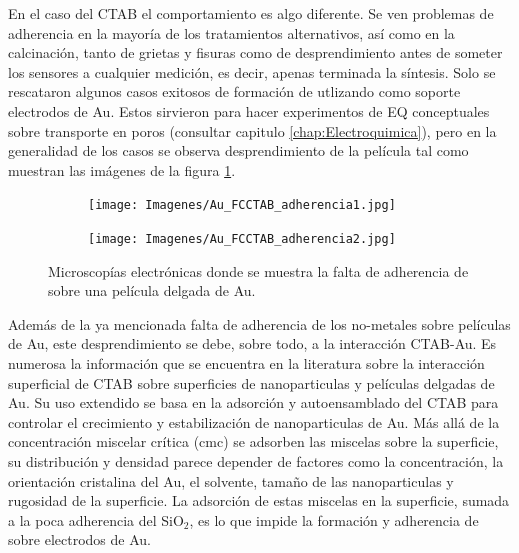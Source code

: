 			En el caso del CTAB el comportamiento es algo diferente. Se ven problemas de adherencia en la mayoría de los tratamientos alternativos, así como en la calcinación, tanto de grietas y fisuras como de desprendimiento antes de someter los sensores a cualquier medición, es decir, apenas terminada la síntesis. Solo se rescataron algunos casos exitosos de formación de \pdmC\space utlizando como soporte electrodos de Au. Estos sirvieron para hacer experimentos de EQ conceptuales sobre transporte en poros (consultar capitulo \ref{chap:Electroquimica}), pero en la generalidad de los casos se observa desprendimiento de la película tal como muestran las imágenes de la figura \ref{fig:CTAB_adherencia}.
	     
				\begin{figure}[th]
		 	   	    \begin{subfigure}[t]{0.49\textwidth}
			        	\texttt{[image: Imagenes/Au\_FCCTAB\_adherencia1.jpg]}
			       		\end{subfigure}
					\begin{subfigure}[t]{0.49\textwidth}
			 	   	    \texttt{[image: Imagenes/Au\_FCCTAB\_adherencia2.jpg]}
			       		\end{subfigure}
					 \caption[Adherencia de CTAB sobre electrodos.]{Microscopías electrónicas donde se muestra la falta de adherencia de \pdmC \space sobre una película delgada de Au.}
					 \label{fig:CTAB_adherencia}	
				     \end{figure}
			Además de la ya mencionada falta de adherencia de los no-metales sobre películas de Au, este desprendimiento se debe, sobre todo, a la interacción CTAB-Au. Es numerosa la información que se encuentra en la literatura sobre la interacción superficial de CTAB sobre superficies de nanoparticulas y películas delgadas de Au\cite{Cheng2003,Smith2008,Lim2014,Meena2013,Wang2013,Hamon2009}. Su uso extendido se basa en la adsorción y autoensamblado del CTAB para controlar el crecimiento y estabilización de nanoparticulas de Au. Más allá de la concentración miscelar crítica (cmc) se adsorben las miscelas sobre la superficie, su distribución y densidad parece depender de factores como la concentración, la orientación cristalina del Au, el solvente, tamaño de las nanoparticulas y rugosidad de la superficie\cite{Meena2013,Lim2014}. La adsorción de estas miscelas en la superficie, sumada a la poca adherencia del SiO$_2$, es lo que impide la formación y adherencia de \pdmC\space sobre electrodos de Au.
		
							
